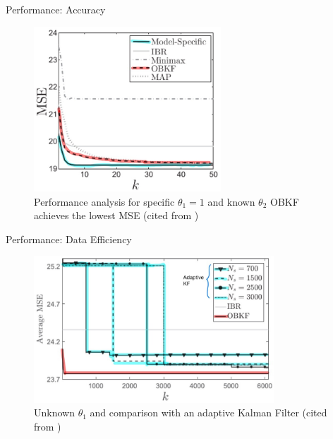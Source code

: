 \begin{frame}{Performance: Accuracy}
\begin{figure}[H]
    \begin{center}
    \includegraphics[width=7cm]{img/OBKF_r1.eps}
    \caption{Performance analysis for specific $\theta_1 = 1$ and known $\theta_2$  \protect\linebreak OBKF achieves the lowest MSE (cited from \cite{Dehghannasiri2018})}
    \label{fig:r_1}
    \end{center}
\end{figure}
\end{frame}

\begin{frame}{Performance: Data Efficiency}
\begin{figure}[H]
    \begin{center}
    \includegraphics[width=9cm]{img/cmp_adaptive.eps}
    \caption{Unknown $\theta_1$ and comparison with an adaptive Kalman Filter (cited from \cite{Dehghannasiri2018})}
    \label{fig:cmp_adaptive}
    \end{center}
\end{figure}

\end{frame}


